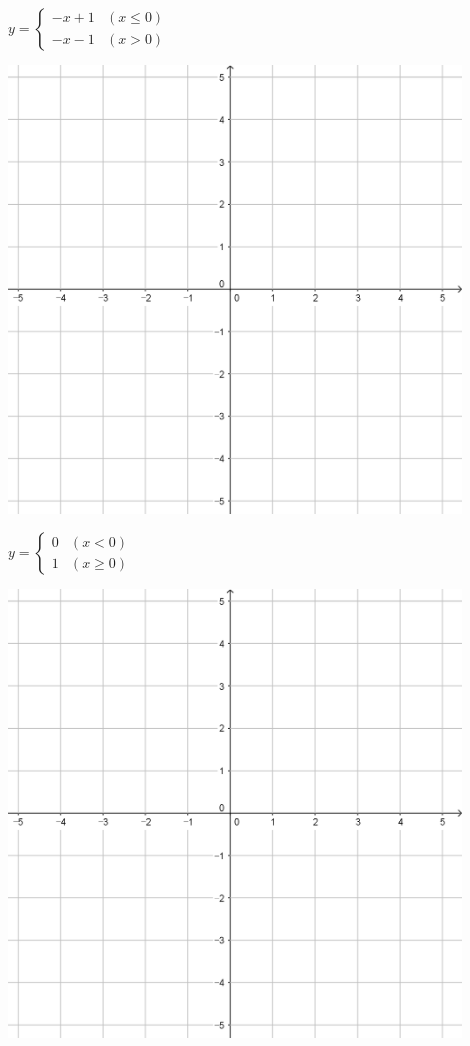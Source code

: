 \documentclass{oblivoir}
\begin{document}
\begin{minipage}{0.45\textwidth}\centering
\(y=\begin{cases}-x+1&(x\le0)\\-x-1&(x>0)\end{cases}\)
\par\bigskip\includegraphics[width=0.9\textwidth]{55}
\end{minipage}
\begin{minipage}{0.45\textwidth}\centering
\(y=\begin{cases}0&(x<0)\\1&(x\ge0)\end{cases}\)
\par\bigskip\includegraphics[width=0.9\textwidth]{55}
\end{minipage}\bigskip\bigskip\par
\end{document}

